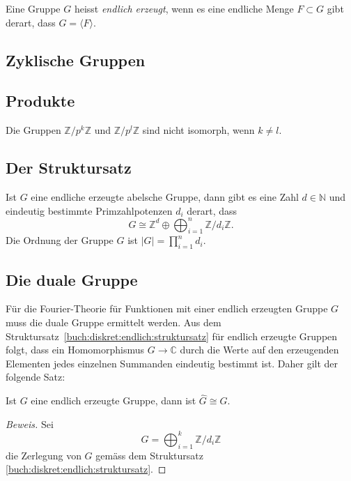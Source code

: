\begin{definition}
Eine Gruppe $G$ heisst {\em endlich erzeugt}, wenn es eine endliche Menge
$F\subset G$ gibt derart, dass $G=\langle F\rangle$.
\end{definition}

%
%
\subsection{Zyklische Gruppen
\label{buch:diskret:endlich:subsection:zyklisch}}

%
%
\subsection{Produkte
\label{buch:diskret:endlich:subsection:produkte}}

\begin{satz}
Die Gruppen $\mathbb{Z}/p^k\mathbb{Z}$ und $\mathbb{Z}/p^l\mathbb{Z}$
sind nicht isomorph, wenn $k\ne l$.
\end{satz}

%
%
\subsection{Der Struktursatz
\label{buch:diskret:endlich:subsection:}}



\begin{satz}
\label{buch:diskret:endlich:struktursatz}
Ist $G$ eine endliche erzeugte abelsche Gruppe, dann gibt es eine
Zahl $d\in\mathbb{N}$ und eindeutig bestimmte Primzahlpotenzen $d_i$
derart, dass
\[
G
\cong
\mathbb{Z}^d
\oplus
\bigoplus_{i=1}^n
\mathbb{Z}/d_i\mathbb{Z}.
\]
Die Ordnung der Gruppe $G$ ist $|G|=\prod_{i=1}^n d_i$.
\end{satz}

%
%
\subsection{Die duale Gruppe
\label{buch:diskret:endlich:subsection:dual}}
Für die Fourier-Theorie für Funktionen mit einer endlich erzeugten
Gruppe $G$ muss die duale Gruppe ermittelt werden.
Aus dem Struktursatz~\ref{buch:diskret:endlich:struktursatz}
für endlich erzeugte Gruppen folgt, dass ein Homomorphismus
$G\to\mathbb{C}$ durch die Werte auf den erzeugenden Elementen
jedes einzelnen Summanden eindeutig bestimmt ist.
Daher gilt der folgende Satz:

\begin{satz}
Ist $G$ eine endlich erzeugte Gruppe, dann ist
$\hat{G}\cong G$.
\end{satz}

\begin{proof}[Beweis]
Sei
\[
G
=
\bigoplus_{i=1}^k \mathbb{Z}/d_i\mathbb{Z}
\]
die Zerlegung von $G$ gemäss dem Struktursatz
\ref{buch:diskret:endlich:struktursatz}.
\end{proof}



